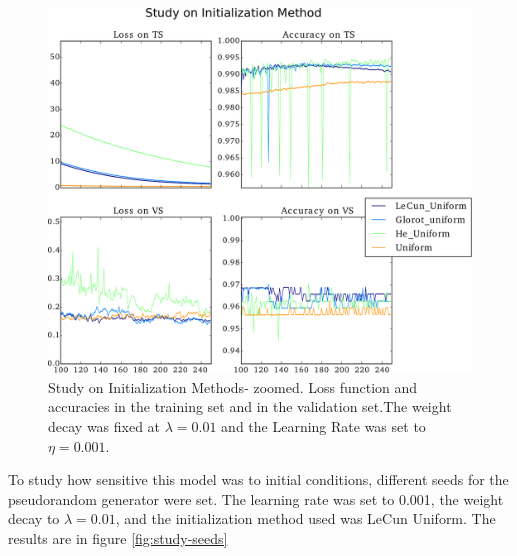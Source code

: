 \documentclass{article}
\begin{document}
\begin{figure}[H]
	\centering
	\includegraphics[width=\linewidth]{study_on_initialization_method_zoomed_v2.pdf}
	\caption{Study on Initialization Methods- zoomed. Loss function and accuracies in the training set and in the validation set.The weight decay was fixed at $\lambda = 0.01$ and the Learning Rate was set to $\eta = 0.001$.
}
\label{fig:study-InitMethods-zoomed}
\end{figure}

To study how sensitive this model was to initial conditions, different seeds for the pseudorandom generator were set. The learning rate was set to 0.001, the weight decay to $\lambda = 0.01$, and the initialization method used was LeCun Uniform. The results are in figure \ref{fig:study-seeds}
\end{document}
